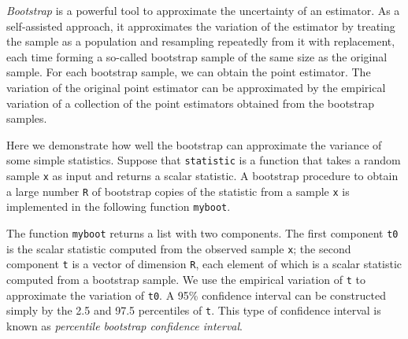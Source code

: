 \emph{Bootstrap}
is a powerful tool to approximate the uncertainty of an estimator.
As a self-assisted approach, it approximates the variation of the estimator by
treating the sample as a population and resampling repeatedly from it with
replacement, each time forming a so-called bootstrap sample of the same size as
the original sample. For each bootstrap sample, we can obtain the point
estimator. The variation of the original point estimator can be approximated by
the empirical variation of a collection of the point estimators obtained from
the bootstrap samples.



Here we demonstrate how well the bootstrap can approximate the variance of some
simple statistics. Suppose that \lstinline{statistic} is a function that takes a
random sample \lstinline{x} as input and returns a scalar statistic. A bootstrap
procedure to obtain a large number \lstinline{R} of bootstrap copies of the
statistic from a sample \lstinline{x} is implemented in the following function
\lstinline{myboot}.


The function \lstinline{myboot} returns a list with two components. The first
component \lstinline{t0} is the scalar statistic computed from the observed
sample \lstinline{x}; the second component \lstinline{t} is a vector
of dimension \lstinline{R}, each element of which is a scalar
statistic computed from a
bootstrap sample. We use the empirical variation of \lstinline{t} to approximate
the variation of \lstinline{t0}. A 95\% confidence interval can be constructed
simply by the 2.5 and 97.5 percentiles of \lstinline{t}. This type of confidence
interval is known as \emph{percentile bootstrap confidence
interval}.


